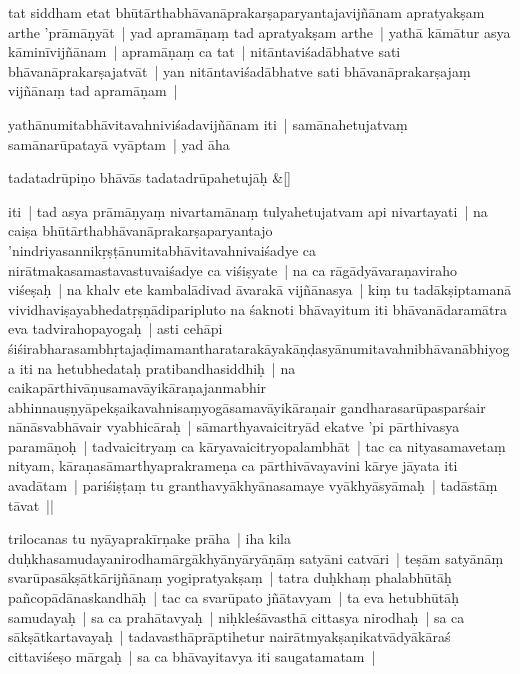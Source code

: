\documentclass[article,12pt,a4paper]{memoir}%
\newcommand{\name}[1]{#1}
\newcommand{\persName}[1]{#1}
\newcounter{parCount}
\begin{document}
	  \pstart \leavevmode%
	\label{thakur75-13.23}tat siddham etat bhūtārthabhāvanāprakarṣaparyantajavijñānam apratyakṣam arthe 'prāmāṇyāt | yad apramāṇaṃ tad apratyakṣam arthe | yathā kāmātur asya kāminīvijñānam | apramāṇaṃ ca tat | nitāntaviśadābhatve sati bhāvanāprakarṣajatvāt | yan nitāntaviśadābhatve sati bhāvanāprakarṣajaṃ vijñānaṃ tad apramāṇam | 
	{}
	\pend%
      

	  \pstart \leavevmode%
	\label{thakur75-14.1}yathānumitabhāvitavahniviśadavijñānam iti | samānahetujatvaṃ samānarūpatayā vyāptam | yad āha 
	{}
	\pend%
      
	    
	    \stanza[\smallbreak]
	  tadatadrūpiṇo bhāvās tadatadrūpahetujāḥ \&[\smallbreak]
	  
	  
	  

	  \pstart \leavevmode%
	iti | tad asya prāmāṇyaṃ nivartamānaṃ tulyahetujatvam api nivartayati | na caiṣa bhūtārthabhāvanāprakarṣaparyantajo 'nindriyasannikṛṣṭānumitabhāvitavahnivaiśadye ca nirātmakasamastavastuvaiśadye ca viśiṣyate | na ca rāgādyāvaraṇaviraho viśeṣaḥ | na khalv ete kambalādivad āvarakā vijñānasya | kiṃ tu tadākṣiptamanā vividhaviṣayabhedatṛṣṇādiparipluto na śaknoti bhāvayitum iti bhāvanādaramātra eva tadvirahopayogaḥ | asti cehāpi śiśirabharasambhṛtajaḍimamantharatarakāyakāṇḍasyānumitavahnibhāvanābhiyoga iti na hetubhedataḥ pratibandhasiddhiḥ | na caikapārthivāṇusamavāyikāraṇajanmabhir abhinnauṣṇyāpekṣaikavahnisaṃyogāsamavāyikāraṇair gandharasarūpasparśair nānāsvabhāvair vyabhicāraḥ | sāmarthyavaicitryād ekatve 'pi pārthivasya paramāṇoḥ | tadvaicitryaṃ ca kāryavaicitryopalambhāt | tac ca nityasamavetaṃ nityam, kāraṇasāmarthyaprakrameṇa ca pārthivāvayavini kārye jāyata iti avadātam | pariśiṣṭaṃ tu granthavyākhyānasamaye vyākhyāsyāmaḥ | tadāstāṃ tāvat || 
	{}
	\pend%
      

	  \pstart \leavevmode%
	\label{thakur75-14.16}\persName{trilocanas} tu \name{nyāyaprakīrṇake} prāha | iha kila duḥkhasamudayanirodhamārgākhyānyāryāṇāṃ satyāni catvāri | teṣām satyānāṃ svarūpasākṣātkārijñānaṃ yogipratyakṣaṃ | tatra duḥkhaṃ phalabhūtāḥ pañcopādānaskandhāḥ | tac ca svarūpato jñātavyam | ta eva hetubhūtāḥ samudayaḥ | sa ca prahātavyaḥ | niḥkleśāvasthā cittasya nirodhaḥ | sa ca sākṣātkartavayaḥ | tadavasthāprāptihetur nairātmyakṣaṇikatvādyākāraś cittaviśeṣo mārgaḥ | sa ca bhāvayitavya iti saugatamatam |
	{}
	\pend%
      
\end{document}
